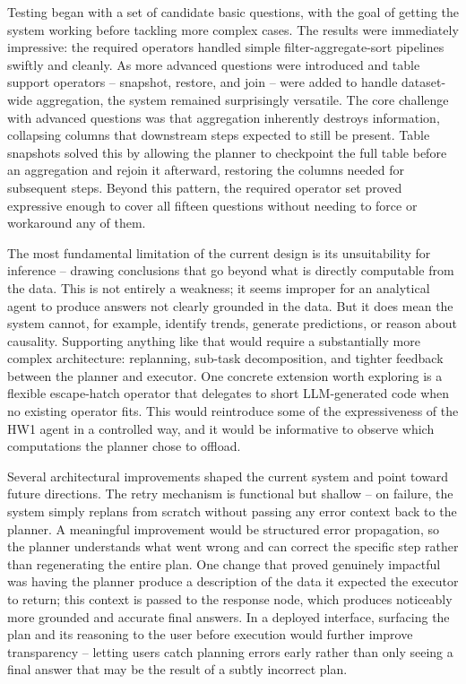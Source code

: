 Testing began with a set of candidate basic questions, with the goal of getting the system working before tackling more complex cases. The results were immediately impressive: the required operators handled simple filter-aggregate-sort pipelines swiftly and cleanly. As more advanced questions were introduced and table support operators -- snapshot, restore, and join -- were added to handle dataset-wide aggregation, the system remained surprisingly versatile. The core challenge with advanced questions was that aggregation inherently destroys information, collapsing columns that downstream steps expected to still be present. Table snapshots solved this by allowing the planner to checkpoint the full table before an aggregation and rejoin it afterward, restoring the columns needed for subsequent steps. Beyond this pattern, the required operator set proved expressive enough to cover all fifteen questions without needing to force or workaround any of them.

The most fundamental limitation of the current design is its unsuitability for inference -- drawing conclusions that go beyond what is directly computable from the data. This is not entirely a weakness; it seems improper for an analytical agent to produce answers not clearly grounded in the data. But it does mean the system cannot, for example, identify trends, generate predictions, or reason about causality. Supporting anything like that would require a substantially more complex architecture: replanning, sub-task decomposition, and tighter feedback between the planner and executor. One concrete extension worth exploring is a flexible escape-hatch operator that delegates to short LLM-generated code when no existing operator fits. This would reintroduce some of the expressiveness of the HW1 agent in a controlled way, and it would be informative to observe which computations the planner chose to offload.

Several architectural improvements shaped the current system and point toward future directions. The retry mechanism is functional but shallow -- on failure, the system simply replans from scratch without passing any error context back to the planner. A meaningful improvement would be structured error propagation, so the planner understands what went wrong and can correct the specific step rather than regenerating the entire plan. One change that proved genuinely impactful was having the planner produce a description of the data it expected the executor to return; this context is passed to the response node, which produces noticeably more grounded and accurate final answers. In a deployed interface, surfacing the plan and its reasoning to the user before execution would further improve transparency -- letting users catch planning errors early rather than only seeing a final answer that may be the result of a subtly incorrect plan.
